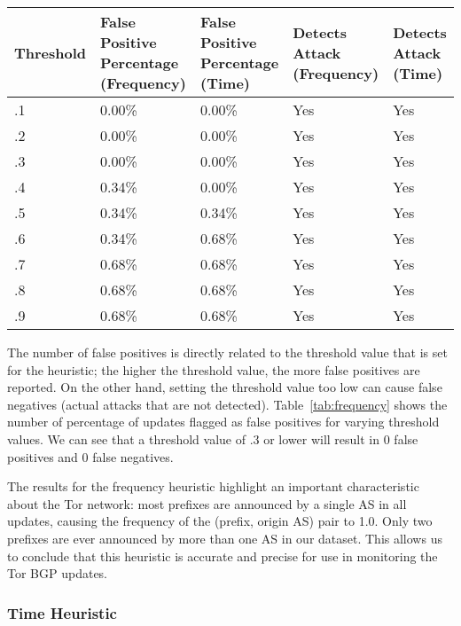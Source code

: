\begin{table*}[ht!]
\begin{center}
    \begin{tabular}{| p{2cm} | p{3cm} | p{3cm} | p{3cm} | p{2cm} |}
    \hline
    Threshold & False Positive 
Percentage (Frequency) & False Positive 
Percentage (Time) & Detects Attack 
(Frequency) & Detects Attack 
(Time)\\ \hline \hline
    .1 & 0.00\% & 0.00\% & Yes & Yes \\ \hline
    .2 & 0.00\% & 0.00\% & Yes & Yes \\ \hline
    .3 & 0.00\% & 0.00\% & Yes & Yes \\ \hline
    .4 & 0.34\% & 0.00\% & Yes & Yes \\ \hline
    .5 & 0.34\% & 0.34\% & Yes & Yes \\ \hline
    .6 & 0.34\% & 0.68\% & Yes & Yes \\ \hline
    .7 & 0.68\% & 0.68\% & Yes & Yes \\ \hline
    .8 & 0.68\% & 0.68\% & Yes & Yes \\ \hline
    .9 & 0.68\% & 0.68\% & Yes & Yes \\
    \hline
    \end{tabular}
\end{center}
\caption{The false positive rates for different thresholds used in the heuristics, as well as false negative rates.}
\label{tab:frequency}
\end{table*}

The number of false positives is directly related to the threshold value that is set for the heuristic; the higher the threshold value, the more false positives are reported.  On the other hand, setting the threshold value too low can cause false negatives (actual attacks that are not detected).  Table~\ref{tab:frequency} shows the number of percentage of updates flagged as false positives for varying threshold values.  We can see that a threshold value of .3 or lower will result in 0 false positives and 0 false negatives.  

The results for the frequency heuristic highlight an important characteristic about the Tor network: most prefixes are announced by a single AS in all updates, causing the frequency of the (prefix, origin AS) pair to 1.0.  Only two prefixes are ever announced by more than one AS in our dataset.  This allows us to conclude that this heuristic is accurate and precise for use in monitoring the Tor BGP updates.

\subsubsection{Time Heuristic}

